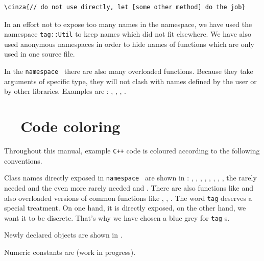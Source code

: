 \begin{Verbatim}[commandchars=\\\{\},formatcom=\small\tt,baselinestretch=0.94]
   \cinza{// do not use directly, let [some other method] do the job}
\end{Verbatim}

In an effort not to expose too many names in the {\small\tt{}} namespace, we have
used the namespace {\small\tt\textcolor{tag}{tag}::Util} to keep names which did not fit elsewhere.
We have also used anonymous namespaces in order to hide names of functions which are
only used in one source file.

In the {\small\tt namespace } there are also many overloaded functions.
Because they take arguments of specific type, they will not clash with names defined
by the user or by other libraries.
Examples are : {\small\tt{}}, {\small\tt{}}, {\small\tt{}},
{\small\tt{}}.


\section{~~Code coloring}\label{\numb section 11.\numb parag 2}

Throughout this manual, example {\tt C++} code is coloured according to the following
conventions.

Class names directly exposed in {\small\tt namespace } are shown in  :
{\small\tt {}}, {\small\tt {}}, {\small\tt {}},
{\small\tt {}}, {\small\tt {}},
{\small\tt {}}, {\small\tt {}},
{\small\tt {}}, the rarely needed {\small\tt {}} and
the even more rarely needed {\small\tt {}} and {\small\tt{}}.
There are also functions like {\small\tt {}} and also overloaded versions
of common functions like {\small\tt{}}, {\small\tt {}}, {\small\tt {}}.
The word {\small\tt \textcolor{tag}{tag}} deserves a special treatment.
On one hand, it is directly exposed, on the other hand, we want it to be discrete.
That's why we have chosen a \textcolor{tag}{blue grey} for {\small\tt \textcolor{tag}{tag}}\hskip0.8pt s.

Newly declared objects are shown in .

Numeric constants are  (work in progress).

